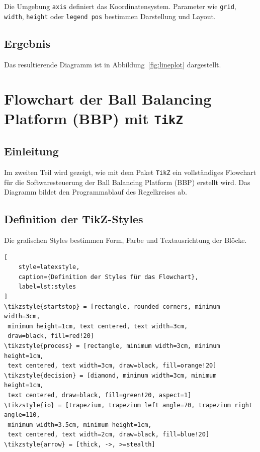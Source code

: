 \documentclass[twoside]{scrreprt}
\begin{document}
\noindent
Die Umgebung \texttt{axis} definiert das Koordinatensystem.  
Parameter wie \texttt{grid}, \texttt{width}, \texttt{height} oder \texttt{legend pos}
bestimmen Darstellung und Layout.

\subsection{Ergebnis}
Das resultierende Diagramm ist in Abbildung~\ref{fig:lineplot} dargestellt.

\begin{center}
\end{center}
\label{fig:lineplot}

\section{Flowchart der Ball Balancing Platform (BBP) mit \texttt{TikZ}}

\subsection{Einleitung}
Im zweiten Teil wird gezeigt, wie mit dem Paket \texttt{TikZ} ein vollständiges
Flowchart für die Softwaresteuerung der Ball Balancing Platform (BBP) erstellt wird.
Das Diagramm bildet den Programmablauf des Regelkreises ab.

\subsection{Definition der TikZ-Styles}
Die grafischen Styles bestimmen Form, Farbe und Textausrichtung der Blöcke.

\begin{lstlisting}[
    style=latexstyle,
    caption={Definition der Styles für das Flowchart},
    label=lst:styles
]
\tikzstyle{startstop} = [rectangle, rounded corners, minimum width=3cm,
 minimum height=1cm, text centered, text width=3cm,
 draw=black, fill=red!20]
\tikzstyle{process} = [rectangle, minimum width=3cm, minimum height=1cm,
 text centered, text width=3cm, draw=black, fill=orange!20]
\tikzstyle{decision} = [diamond, minimum width=3cm, minimum height=1cm,
 text centered, draw=black, fill=green!20, aspect=1]
\tikzstyle{io} = [trapezium, trapezium left angle=70, trapezium right angle=110,
 minimum width=3.5cm, minimum height=1cm,
 text centered, text width=2cm, draw=black, fill=blue!20]
\tikzstyle{arrow} = [thick, ->, >=stealth]
\end{lstlisting}
\end{document}

